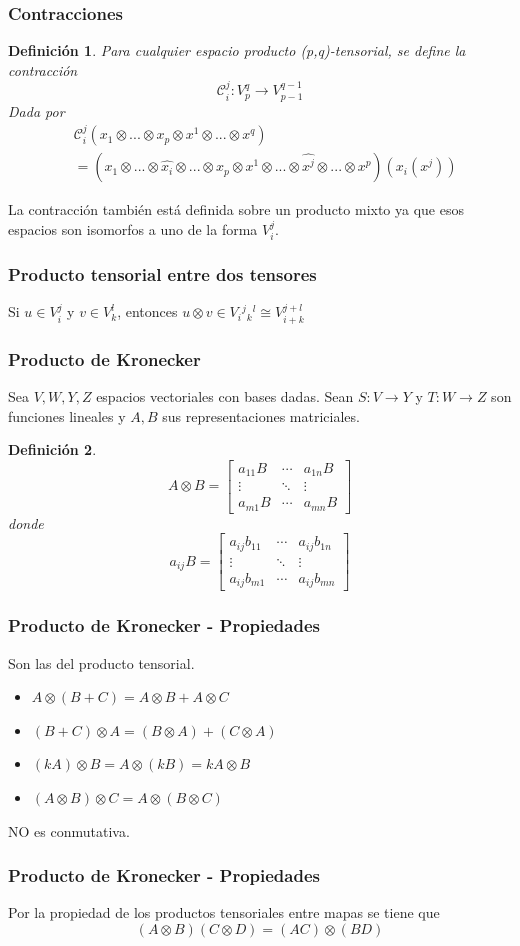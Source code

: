 \documentclass{beamer}
\newtheorem{defi}{Definición}
\begin{document}
\begin{frame}
	\frametitle{Contracciones}
	\begin{defi}
		Para cualquier espacio producto (p,q)-tensorial, se define la contracción
		$$
		\mathcal{C}_i^j : V_p^q \to V_{p-1}^{q-1}
		$$
		Dada por
		$$
		\begin{aligned}
			&\mathcal{C}_i^j(x_1\otimes ...\otimes x_p\otimes x^1 \otimes ...\otimes x^q)\\
			&= (x_1\otimes...\otimes \hat{x_{i}} \otimes ...\otimes x_{p}\otimes x^1 \otimes ... \otimes \hat{x^{j}} \otimes ...\otimes x^p) (x_i(x^j))
		\end{aligned}
		$$
	\end{defi}
	\pause
    La contracción también está definida sobre un producto mixto ya que 
    esos espacios son isomorfos a uno de la forma $V_i^j$.
\end{frame}
\begin{frame}
	\frametitle{Producto tensorial entre dos tensores}
	Si $u \in V_i^j$ y $v \in V_k^l$, entonces
	$u \otimes v \in V_i{^j}{_k}^l \cong V_{i+k}^{j+l}$
\end{frame}
\begin{frame}
	\frametitle{Producto de Kronecker}
	Sea $V,W,Y,Z$ espacios vectoriales con bases dadas.
	\pause
	Sean $S: V\to Y$ y $T: W\to Z$ son funciones lineales y $A, B$ sus representaciones matriciales.
	\pause
	\begin{defi}
		$$
		A \otimes B = 
		\begin{bmatrix}
		a_{11}B & \cdots & a_{1n}B \\
		\vdots & \ddots & \vdots \\
		a_{m1}B & \cdots & a_{mn}B
		\end{bmatrix}
		$$
		donde
		$$
		a_{ij} B = 
		\begin{bmatrix}
			a_{ij} b_{11} & \cdots & a_{ij} b_{1n} \\
		\vdots & \ddots & \vdots \\
			a_{ij} b_{m1} & \cdots & a_{ij} b_{mn}
		\end{bmatrix}
		$$
	\end{defi}
\end{frame}
\begin{frame}
	\frametitle{Producto de Kronecker - Propiedades}
	Son las del producto tensorial.
	\begin{itemize}
		\item $A \otimes (B + C) = A \otimes B + A\otimes C$
		\item $(B+C) \otimes A = (B\otimes A) + (C\otimes A)$
		\item $(k A) \otimes B = A \otimes (k B) = k A \otimes B$
		\item $(A \otimes B) \otimes C = A \otimes (B \otimes C)$
	\end{itemize}
	\pause
	NO es conmutativa.
\end{frame}
\begin{frame}
	\frametitle{Producto de Kronecker - Propiedades}
	Por la propiedad de los productos tensoriales entre mapas se tiene que
	$$
	(A \otimes B) (C \otimes D) = (AC) \otimes (BD)
	$$
\end{frame}
\end{document}

